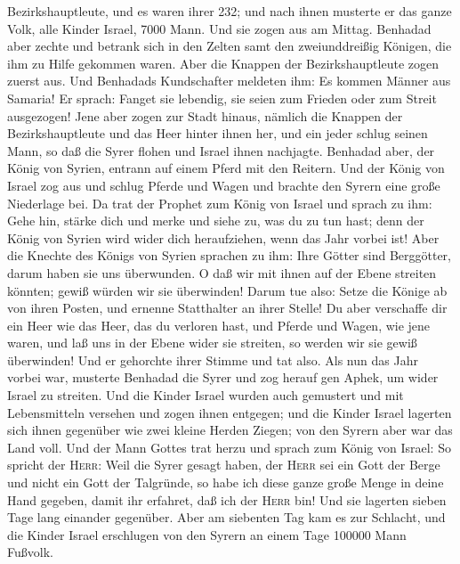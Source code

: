 Bezirkshauptleute, und es waren ihrer 232; und nach ihnen musterte er
das ganze Volk, alle Kinder Israel, 7000 Mann.  Und sie
zogen aus am Mittag. Benhadad aber zechte und betrank sich in den Zelten
samt den zweiunddreißig Königen, die ihm zu Hilfe gekommen waren.
 Aber die Knappen der Bezirkshauptleute zogen zuerst aus.
Und Benhadads Kundschafter meldeten ihm: Es kommen Männer aus Samaria!
 Er sprach: Fanget sie lebendig, sie seien zum Frieden
oder zum Streit ausgezogen!  Jene aber zogen zur Stadt
hinaus, nämlich die Knappen der Bezirkshauptleute und das Heer hinter
ihnen her,  und ein jeder schlug seinen Mann, so daß die
Syrer flohen und Israel ihnen nachjagte. Benhadad aber, der König von
Syrien, entrann auf einem Pferd mit den Reitern.  Und der
König von Israel zog aus und schlug Pferde und Wagen und brachte den
Syrern eine große Niederlage bei.  Da trat der Prophet
zum König von Israel und sprach zu ihm: Gehe hin, stärke dich und merke
und siehe zu, was du zu tun hast; denn der König von Syrien wird wider
dich heraufziehen, wenn das Jahr vorbei ist!  Aber die
Knechte des Königs von Syrien sprachen zu ihm: Ihre Götter sind
Berggötter, darum haben sie uns überwunden. O daß wir mit ihnen auf der
Ebene streiten könnten; gewiß würden wir sie überwinden! 
Darum tue also: Setze die Könige ab von ihren Posten, und ernenne
Statthalter an ihrer Stelle!  Du aber verschaffe dir ein
Heer wie das Heer, das du verloren hast, und Pferde und Wagen, wie jene
waren, und laß uns in der Ebene wider sie streiten, so werden wir sie
gewiß überwinden! Und er gehorchte ihrer Stimme und tat also.
 Als nun das Jahr vorbei war, musterte Benhadad die Syrer
und zog herauf gen Aphek, um wider Israel zu streiten. 
Und die Kinder Israel wurden auch gemustert und mit Lebensmitteln
versehen und zogen ihnen entgegen; und die Kinder Israel lagerten sich
ihnen gegenüber wie zwei kleine Herden Ziegen; von den Syrern aber war
das Land voll.  Und der Mann Gottes trat herzu und sprach
zum König von Israel: So spricht der \textsc{Herr}: Weil die Syrer
gesagt haben, der \textsc{Herr} sei ein Gott der Berge und nicht ein
Gott der Talgründe, so habe ich diese ganze große Menge in deine Hand
gegeben, damit ihr erfahret, daß ich der \textsc{Herr} bin!
 Und sie lagerten sieben Tage lang einander gegenüber.
Aber am siebenten Tag kam es zur Schlacht, und die Kinder Israel
erschlugen von den Syrern an einem Tage 100000 Mann Fußvolk.
